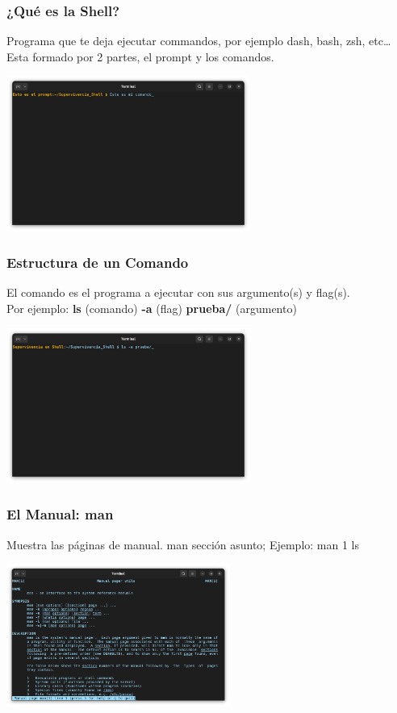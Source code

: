\documentclass[10pt]{beamer}
\begin{document}
	\begin{frame}
		\frametitle{¿Qué es la Shell?}
		Programa que te deja ejecutar commandos, por ejemplo dash, bash, zsh, etc…	\\
		Esta formado por 2 partes, el prompt y los comandos.\\
		
		\begin{center}
			\includegraphics[width=0.60\textwidth]{bash}
		\end{center}
	\end{frame}

	\begin{frame}
		\frametitle{Estructura de un Comando}
		El comando es el programa a ejecutar con sus argumento(s) y flag(s).\\
		Por ejemplo: \textbf{ls} (comando) \textbf{-a} (flag) \textbf{prueba/} (argumento)		
		\begin{center}
			\includegraphics[width=0.60\textwidth]{cmd}
		\end{center}
	\end{frame}
	
	\begin{frame}
		\frametitle{El Manual: man}
		\begin{alertblock}{Muestra las páginas de manual.}
			man sección asunto;    Ejemplo: man 1 ls
		\end{alertblock}
		\begin{center}
			\includegraphics[width=0.55\textwidth]{man}
		\end{center}
	\end{frame}
	
\end{document}
